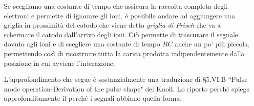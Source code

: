 Se scegliamo una costante di tempo che assicura la raccolta completa degli elettroni e permette di ignorare gli ioni, è possibile andare ad aggiungere una griglia in prossimità del catodo che viene detta \textit{griglia di Frisch} che va a schermare il catodo dall'arrivo degli ioni. Ciò permette di trascurare il segnale dovuto agli ioni e di scegliere una costante di tempo $RC$ anche un po' più piccola, permettendo così di ricostruire tutta la carica prodotta indipendentemente dalla posizione in cui avviene l'interazione. 

\begin{approfondimento}
   \footnotesize
   L'approfondimento che segue è sostanzialmente una traduzione di \S 5.VI.B ``Pulse mode operation-Derivation of the pulse shape" del Knoll. Lo riporto perché spiega approfonditamente il perché i segnali abbiano quella forma.


\end{approfondimento}
